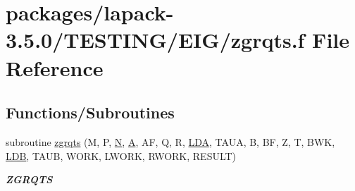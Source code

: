 \hypertarget{zgrqts_8f}{}\section{packages/lapack-\/3.5.0/\+T\+E\+S\+T\+I\+N\+G/\+E\+I\+G/zgrqts.f File Reference}
\label{zgrqts_8f}
\subsection*{Functions/\+Subroutines}
\begin{DoxyCompactItemize}
\item 
subroutine \hyperlink{group__complex16__eig_ga52fe5c26c3ab6431adb83d9bba8b4eeb}{zgrqts} (M, P, \hyperlink{polmisc_8c_a0240ac851181b84ac374872dc5434ee4}{N}, \hyperlink{classA}{A}, A\+F, Q, R, \hyperlink{example__user_8c_ae946da542ce0db94dced19b2ecefd1aa}{L\+D\+A}, T\+A\+U\+A, B, B\+F, Z, T, B\+W\+K, \hyperlink{example__user_8c_a50e90a7104df172b5a89a06c47fcca04}{L\+D\+B}, T\+A\+U\+B, W\+O\+R\+K, L\+W\+O\+R\+K, R\+W\+O\+R\+K, R\+E\+S\+U\+L\+T)
\begin{DoxyCompactList}\small\item\em {\bfseries Z\+G\+R\+Q\+T\+S} \end{DoxyCompactList}\end{DoxyCompactItemize}
